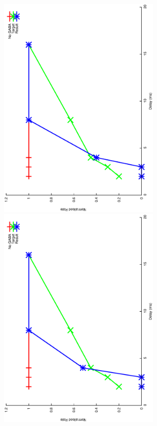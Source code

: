 \documentclass{article}
\begin{document}
\includegraphics[keepaspectratio=true,angle=-90,width=0.6\textwidth]{DS_ClickRecovery_result.25.eps}\clearpage
\includegraphics[keepaspectratio=true,angle=-90,width=0.6\textwidth]{DS_ClickRecovery_result.26.eps}\clearpage
\end{document}
